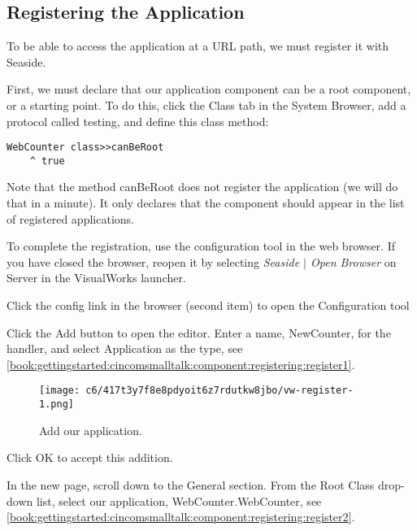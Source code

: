 \documentclass[a4paper,10pt,twoside]{book}
\newcommand{\ct}[1]{{\small\ttfamily\textup{#1}}}
\begin{document}
\subsection{Registering the Application}
\label{book:gettingstarted:cincomsmalltalk:component:registering}

To be able to access the application at a URL path, we must register it with Seaside.

First, we must declare that our application component can be a root component, or a starting point. To do this, click the Class tab in the System Browser, add a protocol called testing, and define this class method:

\begin{lstlisting}
WebCounter class>>canBeRoot 
    ^ true 
\end{lstlisting}

Note that the method \ct{canBeRoot} does not register the application (we will do that in a minute). It only declares that the component should appear in the list of registered applications.

To complete the registration, use the configuration tool in the web browser. If you have closed the browser, reopen it by selecting \textit{Seaside $|$ Open Browser} on Server in the VisualWorks launcher.

Click the config link in the browser (second item) to open the Configuration tool

Click the Add button to open the editor. Enter a name, NewCounter, for the handler, and select Application as the type, see \autoref{book:gettingstarted:cincomsmalltalk:component:registering:register1}.

\begin{figure}[h!tbp]
	\begin{center}
		\texttt{[image: c6/417t3y7f8e8pdyoit6z7rdutkw8jbo/vw-register-1.png]}
		\caption{Add our application.\label{book:gettingstarted:cincomsmalltalk:component:registering:register1}}
	\end{center}
\end{figure}


Click OK to accept this addition.

In the new page, scroll down to the General section. From the Root Class drop-down list, select our application, WebCounter.WebCounter,  see \autoref{book:gettingstarted:cincomsmalltalk:component:registering:register2}.
\end{document}
